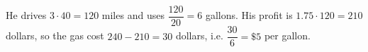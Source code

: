 He drives $3\cdot40=120$ miles and uses $\dfrac{120}{20}=6$ gallons. His profit is $1.75\cdot120=210$ dollars, so the gas cost $240-210=30$ dollars, i.e. $\dfrac{30}{6}=\boxed{\$5}$ per gallon.
